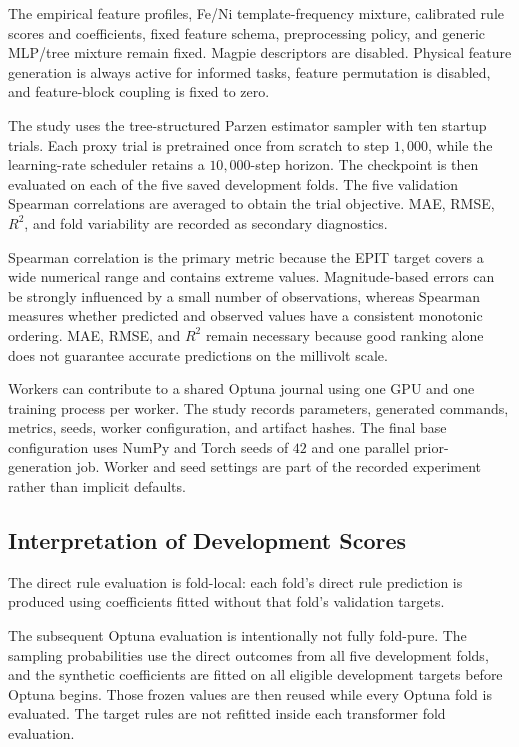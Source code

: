 \documentclass{article}
\begin{document}
The empirical feature profiles, Fe/Ni template-frequency mixture, calibrated
rule scores and coefficients, fixed feature schema, preprocessing policy,
and generic MLP/tree mixture remain fixed. Magpie descriptors are disabled.
Physical feature generation is always active for informed tasks, feature
permutation is disabled, and feature-block coupling is fixed to zero.

The study uses the tree-structured Parzen estimator sampler with ten startup
trials. Each proxy trial is pretrained once from scratch to step \(1{,}000\),
while the learning-rate scheduler retains a \(10{,}000\)-step horizon. The
checkpoint is then evaluated on each of the five saved development folds.
The five validation Spearman correlations are averaged to obtain the trial
objective. MAE, RMSE, \(R^2\), and fold variability are recorded as secondary
diagnostics.

Spearman correlation is the primary metric because the EPIT target covers a
wide numerical range and contains extreme values. Magnitude-based errors can
be strongly influenced by a small number of observations, whereas Spearman
measures whether predicted and observed values have a consistent monotonic
ordering. MAE, RMSE, and \(R^2\) remain necessary because good ranking alone
does not guarantee accurate predictions on the millivolt scale.

Workers can contribute to a shared Optuna journal using one GPU and one
training process per worker. The study records parameters, generated commands,
metrics, seeds, worker configuration, and artifact hashes. The final base
configuration uses NumPy and Torch seeds of \(42\) and one parallel
prior-generation job. Worker and seed settings are part of the recorded
experiment rather than implicit defaults.

\subsection{Interpretation of Development Scores}

The direct rule evaluation is fold-local: each fold's direct rule prediction
is produced using coefficients fitted without that fold's validation targets.

The subsequent Optuna evaluation is intentionally not fully fold-pure. The
sampling probabilities use the direct outcomes from all five development
folds, and the synthetic coefficients are fitted on all eligible development
targets before Optuna begins. Those frozen values are then reused while
every Optuna fold is evaluated. The target rules are not refitted inside each
transformer fold evaluation.
\end{document}
